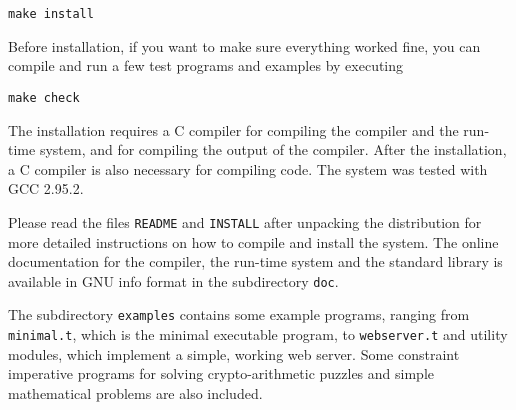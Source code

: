 \begin{appendix}
{\tt make install}

\noindent
Before installation, if you want to make sure everything worked fine,
you can compile and run a few test programs and examples by executing

{\tt make check}

\noindent
The installation requires a C compiler for compiling the compiler and
the run-time system, and for compiling the output of the \turtle{}
compiler.  After the installation, a C compiler is also necessary for
compiling \turtle{} code.  The \turtle{} system was tested with GCC
2.95.2.

Please read the files {\tt README} and {\tt INSTALL} after unpacking
the distribution for more detailed instructions on how to compile and
install the system.  The online documentation for the compiler, the
run-time system and the standard library is available in GNU info
format in the subdirectory {\tt doc}.

The subdirectory {\tt examples} contains some example programs,
ranging from {\tt minimal.t}, which is the minimal executable
\turtle{} program, to {\tt webserver.t} and utility modules, which
implement a simple, working web server.  Some constraint
im\-per\-ative programs for solving crypto-arithmetic puzzles and
simple mathematical problems are also included.

\end{appendix}


